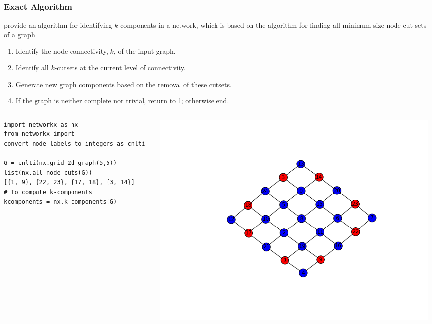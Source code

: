 \documentclass[ignorenonframetext,red,8pt,notes=show]{beamer}
\begin{document}
\begin{frame}[fragile]
\frametitle{Exact Algorithm}

\citet[appendix A]{moody:2003} provide an algorithm for identifying $k$-components in a network, which is based on the \citet{kanevsky:1993} algorithm for finding all minimum-size node cut-sets of a graph.

\begin{enumerate}

\item Identify the node connectivity, $k$, of the input graph.

\item Identify all $k$-cutsets at the current level of connectivity.

\item Generate new graph components based on the removal of these cutsets.

\item If the graph is neither complete nor trivial, return to 1; otherwise end.

\end{enumerate}


\begin{columns}[c]
\begin{column}{0.4\textwidth}
\begin{scriptsize}
\begin{lstlisting}
import networkx as nx
from networkx import convert_node_labels_to_integers as cnlti

G = cnlti(nx.grid_2d_graph(5,5))
list(nx.all_node_cuts(G))
[{1, 9}, {22, 23}, {17, 18}, {3, 14}]
# To compute k-components
kcomponents = nx.k_components(G)
\end{lstlisting}
\end{scriptsize}

\end{column}

\begin{column}{0.6\textwidth}
\begin{center}
\includegraphics[scale=0.45]{img/grid}
\end{center}

\end{column}
\end{columns}

\end{frame}
\end{document}
